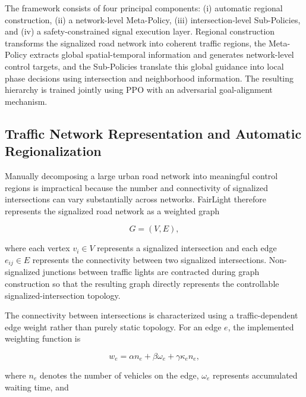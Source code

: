 \documentclass[3p,times]{elsarticle}
\theoremstyle{plain}
\theoremstyle{definition}
\begin{document}
The framework consists of four principal components: (i)
automatic regional construction, (ii) a network-level Meta-Policy,
(iii) intersection-level Sub-Policies, and (iv) a safety-constrained
signal execution layer. Regional construction transforms the
signalized road network into coherent traffic regions, the Meta-Policy
extracts global spatial-temporal information and generates
network-level control targets, and the Sub-Policies translate this
global guidance into local phase decisions using intersection and
neighborhood information. The resulting hierarchy is trained jointly
using PPO with an adversarial goal-alignment mechanism.


\subsection{Traffic Network Representation and Automatic
Regionalization}\label{subsec3-5}

Manually decomposing a large urban road network into meaningful
control regions is impractical because the number and connectivity of
signalized intersections can vary substantially across networks.
FairLight therefore represents the signalized road network as a
weighted graph

\begin{equation}
G = (V, E),
\end{equation}

where each vertex $v_i \in V$ represents a signalized intersection and
each edge $e_{ij} \in E$ represents the connectivity between two
signalized intersections. Non-signalized junctions between traffic
lights are contracted during graph construction so that the resulting
graph directly represents the controllable signalized-intersection
topology.

The connectivity between intersections is characterized using a
traffic-dependent edge weight rather than purely static topology. For
an edge $e$, the implemented weighting function is

\begin{equation}
w_e = \alpha n_e + \beta \omega_e + \gamma \kappa_e n_e,
\end{equation}

where $n_e$ denotes the number of vehicles on the edge, $\omega_e$
represents accumulated waiting time, and
\end{document}
